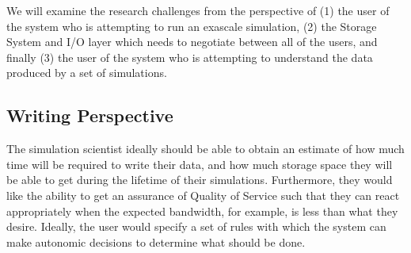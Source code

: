


We will examine the research challenges from the perspective of
%
(1) the user of the system who is attempting to run an exascale simulation,
%
(2) the Storage System and I/O layer which needs to negotiate between all of
the users, and finally
%
(3) the user of the system who is attempting to understand the data
produced by a set of simulations.

\subsection{Writing Perspective}
\label{subsec:sim-perspective}
The simulation scientist ideally should be able to
obtain an estimate of how much time will be required to write their data,
and how much storage space they will be able to get during the lifetime of
their simulations. Furthermore, they would like the ability to get an assurance
of Quality of Service such that they can react appropriately when the
expected bandwidth, for example, is less than what they desire. Ideally, the user
would specify a set of rules with which the system can make autonomic
decisions to determine what should be done.
%

